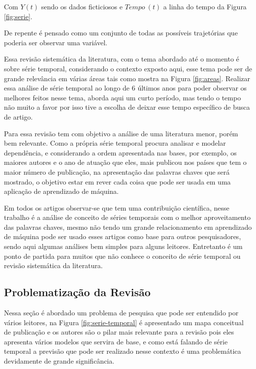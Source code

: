 

Com $Y(t)$ sendo os dados ficticiosos e $Tempo \ (t)$ a linha do tempo da Figura \ref{fig:serie}.

De repente é pensado como um conjunto de todas as possíveis trajetórias que poderia ser observar uma variável.


Essa revisão sistemática da literatura, com o tema abordado até o momento é sobre série temporal, considerando o contexto exposto aqui, esse tema pode ser de grande relevância em várias áreas tais como mostra na Figura \ref{fig:areas}. Realizar essa análise de série temporal ao longo de 6 últimos anos para poder observar os melhores feitos nesse tema, aborda aqui um curto período, mas tendo o tempo não muito a favor por isso tive a escolha de deixar esse tempo específico de busca de artigo.

Para essa revisão tem com objetivo a análise de uma literatura menor, porém bem relevante. Como a própria série temporal procura analisar e modelar dependência, e considerando a ordem apresentada nas bases, por exemplo, os maiores autores e o ano de atuação que eles, mais publicou nos países que tem o maior número de publicação, na apresentação das palavras chaves que será mostrado, o objetivo estar em rever cada coisa que pode ser usada em uma aplicação de aprendizado de máquina.

Em todos os artigos observar-se que tem uma contribuição científica, nesse trabalho é a análise de conceito de séries temporais com o melhor aproveitamento das palavras chaves, mesmo não tendo um grande relacionamento em aprendizado de máquina pode ser usado esses artigos como base para outros pesquisadores, sendo aqui algumas análises bem simples para alguns leitores. Entretanto é um ponto de partida para muitos que não conhece o conceito de série temporal ou revisão sistemática da literatura.


\subsection{Problematização da Revisão} \label{subsec: problematização da revisão}

Nessa seção é abordado um problema de pesquisa que pode ser entendido por vários leitores, na Figura \ref{fig:serie-temporal} é apresentado um mapa conceitual de publicação e os autores são o pilar mais relevante para a revisão pois eles apresenta vários modelos que servira de base, e como está falando de série temporal a previsão que pode ser realizado nesse contexto é uma problemática devidamente de grande significância.

